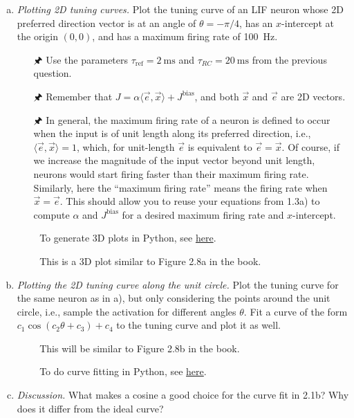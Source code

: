 	\begin{enumerate}[a)]
		\item {} \emph{Plotting 2D tuning curves.} Plot the tuning curve of an LIF neuron whose 2D preferred direction vector is at an angle of $\theta=-\pi/4$, has an $x$-intercept at the origin $(0,0)$, and has a maximum firing rate of \SI{100}{\hertz}.
		\begin{itemize}
			\item[{\symbolfont 🖈}] Use the parameters $\tau_\mathrm{ref}=\SI{2}{\milli\second}$ and $\tau_{RC}=\SI{20}{\milli\second}$ from the previous question.
			\item[{\symbolfont 🖈}] Remember that $J=\alpha \langle \vec e, \vec x \rangle + J^\mathrm{bias}$, and both $\vec x$ and $\vec e$ are 2D vectors.
			\item[{\symbolfont 🖈}] In general, the maximum firing rate of a neuron is defined to occur when the input is of unit length along its preferred direction, i.e.,~$\langle \vec e, \vec x \rangle = 1$, which, for unit-length $\vec e$ is equivalent to $\vec e = \vec x$. Of course, if we increase the magnitude of the input vector beyond unit length, neurons would start firing faster than their maximum firing rate. Similarly, here the \enquote{maximum firing rate} means the firing rate when $\vec x = \vec e$. This should allow you to reuse your equations from 1.3a) to compute $\alpha$ and $J^\mathrm{bias}$ for a desired maximum firing rate and $x$-intercept.
			\item[{\symbolfont 🐍}] To generate 3D plots in Python, see \href{http://matplotlib.org/mpl_toolkits/mplot3d/tutorial.html}{here}.
			\item[{\symbolfont 📖}] This is a 3D plot similar to Figure 2.8a in the book.
		\end{itemize}
		\item {} \emph{Plotting the 2D tuning curve along the unit circle.} Plot the tuning curve for the same neuron as in a), but only considering the points around the unit circle, i.e., sample the activation for different angles $\theta$. Fit a curve of the form $c_1 \cos(c_2\theta+c_3)+c_4$ to the tuning curve and plot it as well.
		\begin{itemize}
			\item[{\symbolfont 📖}] This will be similar to Figure 2.8b in the book.
			\item[{\symbolfont 🐍}] To do curve fitting in Python, see \href{http://docs.scipy.org/doc/scipy/reference/generated/scipy.optimize.curve_fit.html}{here}.
		\end{itemize}
		\item {} \emph{Discussion.} What makes a cosine a good choice for the curve fit in 2.1b? Why does it differ from the ideal curve?
	\end{enumerate}

